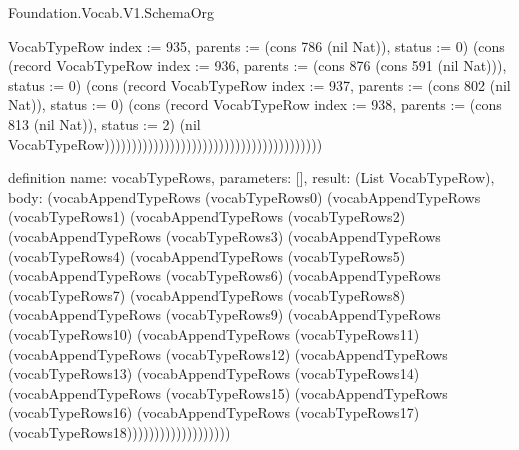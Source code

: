 \begin{lexlean}{Foundation.Vocab.V1.SchemaOrg}
\begin{semanticmodule}
{VocabTypeRow {index := 935, parents := (cons 786 (nil Nat)), status := 0}) (cons (record VocabTypeRow {index := 936, parents := (cons 876 (cons 591 (nil Nat))), status := 0}) (cons (record VocabTypeRow {index := 937, parents := (cons 802 (nil Nat)), status := 0}) (cons (record VocabTypeRow {index := 938, parents := (cons 813 (nil Nat)), status := 2}) (nil VocabTypeRow))))))))))))))))))))))))))))))))))))))))
}

definition{
  name: vocabTypeRows,
  parameters: [],
  result: (List VocabTypeRow),
  body: (vocabAppendTypeRows (vocabTypeRows0) (vocabAppendTypeRows (vocabTypeRows1) (vocabAppendTypeRows (vocabTypeRows2) (vocabAppendTypeRows (vocabTypeRows3) (vocabAppendTypeRows (vocabTypeRows4) (vocabAppendTypeRows (vocabTypeRows5) (vocabAppendTypeRows (vocabTypeRows6) (vocabAppendTypeRows (vocabTypeRows7) (vocabAppendTypeRows (vocabTypeRows8) (vocabAppendTypeRows (vocabTypeRows9) (vocabAppendTypeRows (vocabTypeRows10) (vocabAppendTypeRows (vocabTypeRows11) (vocabAppendTypeRows (vocabTypeRows12) (vocabAppendTypeRows (vocabTypeRows13) (vocabAppendTypeRows (vocabTypeRows14) (vocabAppendTypeRows (vocabTypeRows15) (vocabAppendTypeRows (vocabTypeRows16) (vocabAppendTypeRows (vocabTypeRows17) (vocabTypeRows18)))))))))))))))))))
}


\end{semanticmodule}
\end{lexlean}

